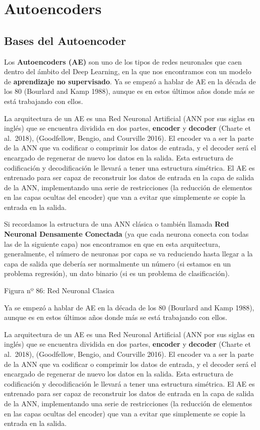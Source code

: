 \documentclass[
  a4paper,
  DIV=11,
  numbers=noendperiod]{scrreprt}
\begin{document}
\section{Autoencoders}\label{autoencoders}

\subsection{Bases del Autoencoder}\label{bases-del-autoencoder}

Los \textbf{Autoencoders (AE)} son uno de los tipos de redes neuronales
que caen dentro del ámbito del Deep Learning, en la que nos encontramos
con un modelo de \textbf{aprendizaje no supervisado}. Ya se empezó a
hablar de AE en la década de los 80 (Bourlard and Kamp 1988), aunque es
en estos últimos años donde más se está trabajando con ellos.

La arquitectura de un AE es una Red Neuronal Artificial (ANN por sus
siglas en inglés) que se encuentra dividida en dos partes,
\textbf{encoder} y \textbf{decoder} (Charte et al.~2018), (Goodfellow,
Bengio, and Courville 2016). El encoder va a ser la parte de la ANN que
va codificar o comprimir los datos de entrada, y el decoder será el
encargado de regenerar de nuevo los datos en la salida. Esta estructura
de codificación y decodificación le llevará a tener una estructura
simétrica. El AE es entrenado para ser capaz de reconstruir los datos de
entrada en la capa de salida de la ANN, implementando una serie de
restricciones (la reducción de elementos en las capas ocultas del
encoder) que van a evitar que simplemente se copie la entrada en la
salida.

Si recordamos la estructura de una ANN clásica o también llamada
\textbf{Red Neuronal Densamente} \textbf{Conectada} (ya que cada neurona
conecta con todas las de la siguiente capa) nos encontramos en que en
esta arquitectura, generalmente, el número de neuronas por capa se va
reduciendo hasta llegar a la capa de salida que debería ser normalmente
un número (si estamos en un problema regresión), un dato binario (si es
un problema de clasificación).

Figura nº 86: Red Neuronal Clasica

Ya se empezó a hablar de AE en la década de los 80 (Bourlard and Kamp
1988), aunque es en estos últimos años donde más se está trabajando con
ellos.

La arquitectura de un AE es una Red Neuronal Artificial (ANN por sus
siglas en inglés) que se encuentra dividida en dos partes,
\textbf{encoder} y \textbf{decoder} (Charte et al.~2018), (Goodfellow,
Bengio, and Courville 2016). El encoder va a ser la parte de la ANN que
va codificar o comprimir los datos de entrada, y el decoder será el
encargado de regenerar de nuevo los datos en la salida. Esta estructura
de codificación y decodificación le llevará a tener una estructura
simétrica. El AE es entrenado para ser capaz de reconstruir los datos de
entrada en la capa de salida de la ANN, implementando una serie de
restricciones (la reducción de elementos en las capas ocultas del
encoder) que van a evitar que simplemente se copie la entrada en la
salida.
\end{document}
